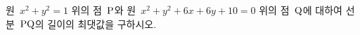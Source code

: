 원~$x^2+y^2=1$ 위의 점~$\mathrm{P}$와 원~$x^2+y^2+6x+6y+10=0$ 위의 점~$\mathrm{Q}$에 대하여 선분~$\mathrm{PQ}$의 길이의 최댓값을 구하시오.
